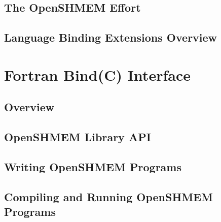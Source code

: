 \documentclass[10pt]{book}
\begin{document}



\section{The OpenSHMEM Effort}\label{subsec:openshmem_effort}


\section{Language Binding Extensions Overview}\label{subsec:lang_ext_overview}


\clearpage

\chapter{Fortran Bind(C) Interface}

\section{Overview}\label{subsec:ftn08_overview}


\section{OpenSHMEM Library API}\label{subsec:ftn08_api}


\section{Writing OpenSHMEM Programs}\label{subsec:ftn08_writing}


\section{Compiling and Running OpenSHMEM Programs}\label{subsec:ftn08_compiling}


\clearpage
{}
{}
\printindex
\end{document}
